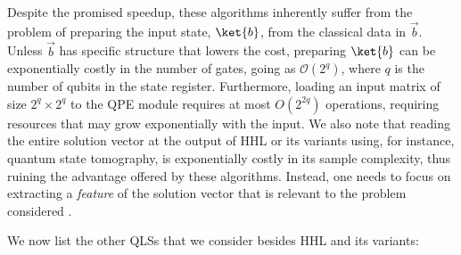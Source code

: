 \documentclass[%
 reprint,
 superscriptaddress,
 amsmath,amssymb,
 aps,
 pra,
floatfix,
nofootinbib,
]{revtex4-2}
\theoremstyle{definition}
\theoremstyle{remark}
\begin{document}
Despite the promised speedup, these algorithms inherently suffer from the problem of preparing the input state, $\ket{b}$, from the classical data in $\vec{b}$. Unless $\vec{b}$ has specific structure that lowers the cost, preparing $\ket{b}$ can be exponentially costly in the number of gates, going as $\mathcal{O}(2^q)$, where $q$ is the number of qubits in the state register. Furthermore, loading an input matrix of size $2^q \times 2^q$ to the QPE module requires at most $O(2^{2q})$ operations, requiring resources that may grow exponentially with the input. We also note that reading the entire solution vector at the output of HHL or its variants using, for instance, quantum state tomography, is exponentially costly in its sample complexity, thus ruining the advantage offered by these algorithms. Instead, one needs to focus on extracting a \textit{feature} of the solution vector that is relevant to the problem considered \cite{Aaronson, morales}. 

We now list the other QLSs that we consider besides HHL and its variants: 
\end{document}
